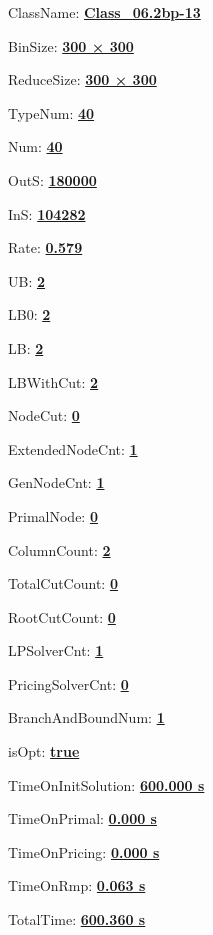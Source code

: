 \documentclass[11pt]{article}
\begin{document}
\pagestyle{empty}


ClassName: \underline{\textbf{Class_06.2bp-13}}
\par
BinSize: \underline{\textbf{300 × 300}}
\par
ReduceSize: \underline{\textbf{300 × 300}}
\par
TypeNum: \underline{\textbf{40}}
\par
Num: \underline{\textbf{40}}
\par
OutS: \underline{\textbf{180000}}
\par
InS: \underline{\textbf{104282}}
\par
Rate: \underline{\textbf{0.579}}
\par
UB: \underline{\textbf{2}}
\par
LB0: \underline{\textbf{2}}
\par
LB: \underline{\textbf{2}}
\par
LBWithCut: \underline{\textbf{2}}
\par
NodeCut: \underline{\textbf{0}}
\par
ExtendedNodeCnt: \underline{\textbf{1}}
\par
GenNodeCnt: \underline{\textbf{1}}
\par
PrimalNode: \underline{\textbf{0}}
\par
ColumnCount: \underline{\textbf{2}}
\par
TotalCutCount: \underline{\textbf{0}}
\par
RootCutCount: \underline{\textbf{0}}
\par
LPSolverCnt: \underline{\textbf{1}}
\par
PricingSolverCnt: \underline{\textbf{0}}
\par
BranchAndBoundNum: \underline{\textbf{1}}
\par
isOpt: \underline{\textbf{true}}
\par
TimeOnInitSolution: \underline{\textbf{600.000 s}}
\par
TimeOnPrimal: \underline{\textbf{0.000 s}}
\par
TimeOnPricing: \underline{\textbf{0.000 s}}
\par
TimeOnRmp: \underline{\textbf{0.063 s}}
\par
TotalTime: \underline{\textbf{600.360 s}}
\par
\newpage
\end{document}
